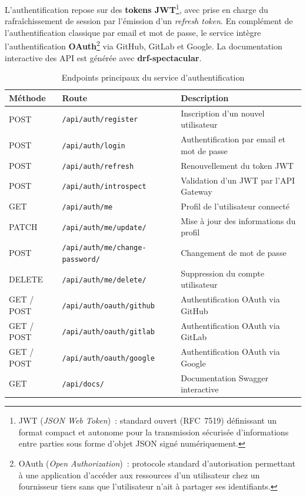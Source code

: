 L'authentification repose sur des \textbf{tokens JWT}\footnote{JWT (\textit{JSON Web Token})~:
standard ouvert (RFC~7519) définissant un format compact et autonome pour la transmission
sécurisée d'informations entre parties sous forme d'objet JSON signé numériquement.}, avec prise
en charge du rafraîchissement de session par l'émission d'un \textit{refresh token}. En complément
de l'authentification classique par email et mot de passe, le service intègre l'authentification
\textbf{OAuth}\footnote{OAuth (\textit{Open Authorization})~: protocole standard d'autorisation
permettant à une application d'accéder aux ressources d'un utilisateur chez un fournisseur tiers
sans que l'utilisateur n'ait à partager ses identifiants.} via GitHub, GitLab et Google. La
documentation interactive des API est générée avec \textbf{drf-spectacular}.

\begin{table}[H]
\centering
\small
\caption{Endpoints principaux du service d'authentification}
\label{tab:endpoints-auth}
\begin{tabular}{|>{\centering\arraybackslash}p{1.6cm}
                |>{\raggedright\arraybackslash}p{6.2cm}
                |>{\raggedright\arraybackslash}p{4.8cm}|}
\hline
\textbf{Méthode} & \textbf{Route} & \textbf{Description} \\
\hline
POST & \texttt{/api/auth/register} & Inscription d'un nouvel utilisateur \\
\hline
POST & \texttt{/api/auth/login} & Authentification par email et mot de passe \\
\hline
POST & \texttt{/api/auth/refresh} & Renouvellement du token JWT \\
\hline
POST & \texttt{/api/auth/introspect} & Validation d'un JWT par l'API Gateway \\
\hline
GET & \texttt{/api/auth/me} & Profil de l'utilisateur connecté \\
\hline
PATCH & \texttt{/api/auth/me/update/} & Mise à jour des informations du profil \\
\hline
POST & \texttt{/api/auth/me/change-password/} & Changement de mot de passe \\
\hline
DELETE & \texttt{/api/auth/me/delete/} & Suppression du compte utilisateur \\
\hline
GET / POST & \texttt{/api/auth/oauth/github} & Authentification OAuth via GitHub \\
\hline
GET / POST & \texttt{/api/auth/oauth/gitlab} & Authentification OAuth via GitLab \\
\hline
GET / POST & \texttt{/api/auth/oauth/google} & Authentification OAuth via Google \\
\hline
GET & \texttt{/api/docs/} & Documentation Swagger interactive \\
\hline
\end{tabular}
\end{table}

